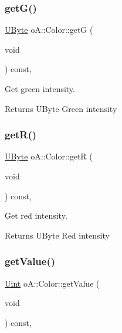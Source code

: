 \subsubsection{\texorpdfstring{get\+G()}{getG()}}
{\footnotesize\ttfamily \mbox{\hyperlink{namespaceo_a_a8c38e43a304d568b8495770dd8d50513}{U\+Byte}} o\+A\+::\+Color\+::getG (\begin{DoxyParamCaption}\item[{void}]{ }\end{DoxyParamCaption}) const\hspace{0.3cm}{\ttfamily [inline]}, {\ttfamily [noexcept]}}



Get green intensity. 

\begin{DoxyReturn}{Returns}
U\+Byte Green intensity 
\end{DoxyReturn}
\mbox{\label{classo_a_1_1_color_af53e0f3c94638ab041fe05ce7356c2d8}} 
\subsubsection{\texorpdfstring{get\+R()}{getR()}}
{\footnotesize\ttfamily \mbox{\hyperlink{namespaceo_a_a8c38e43a304d568b8495770dd8d50513}{U\+Byte}} o\+A\+::\+Color\+::getR (\begin{DoxyParamCaption}\item[{void}]{ }\end{DoxyParamCaption}) const\hspace{0.3cm}{\ttfamily [inline]}, {\ttfamily [noexcept]}}



Get red intensity. 

\begin{DoxyReturn}{Returns}
U\+Byte Red intensity 
\end{DoxyReturn}
\mbox{\label{classo_a_1_1_color_ac010d6318a14cebb3123929159fbab93}} 
\subsubsection{\texorpdfstring{get\+Value()}{getValue()}}
{\footnotesize\ttfamily \mbox{\hyperlink{namespaceo_a_abe1d8250226c5cf34f84d7b75fc7922e}{Uint}} o\+A\+::\+Color\+::get\+Value (\begin{DoxyParamCaption}\item[{void}]{ }\end{DoxyParamCaption}) const\hspace{0.3cm}{\ttfamily [inline]}, {\ttfamily [noexcept]}}



